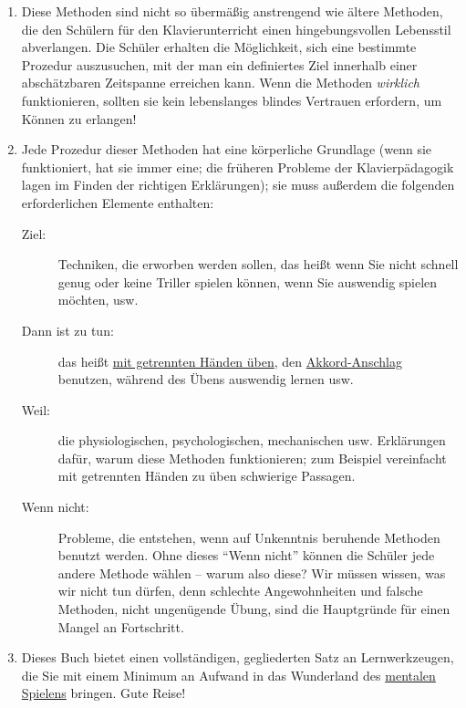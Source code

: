 \begin{enumerate}[label={\arabic*.}] 
\item Diese Methoden sind nicht so übermäßig anstrengend wie ältere Methoden, die den Schülern für den Klavierunterricht einen hingebungsvollen Lebensstil abverlangen.
Die Schüler erhalten die Möglichkeit, sich eine bestimmte Prozedur auszusuchen, mit der man ein definiertes Ziel innerhalb einer abschätzbaren Zeitspanne erreichen kann.
Wenn die Methoden \textit{wirklich} funktionieren, sollten sie kein lebenslanges blindes Vertrauen erfordern, um Können zu erlangen!

\item Jede Prozedur dieser Methoden hat eine körperliche Grundlage (wenn sie funktioniert, hat sie immer eine; die früheren Probleme der Klavierpädagogik lagen im Finden der richtigen Erklärungen); sie muss außerdem die folgenden erforderlichen Elemente enthalten:

\begin{description}
\item[Ziel:] Techniken, die erworben werden sollen, das heißt wenn Sie nicht schnell genug oder keine Triller spielen können, wenn Sie auswendig spielen möchten, usw.
\item[Dann ist zu tun:] das heißt \hyperref[c1ii7]{mit getrennten Händen üben}, den \hyperref[c1ii9]{Akkord-Anschlag} benutzen, während des Übens auswendig lernen usw.
\item[Weil:] die physiologischen, psychologischen, mechanischen usw. Erklärungen dafür, warum diese Methoden funktionieren; zum Beispiel vereinfacht mit getrennten Händen zu üben schwierige Passagen.
\item[Wenn nicht:] Probleme, die entstehen, wenn auf Unkenntnis beruhende Methoden benutzt werden.
Ohne dieses \enquote{Wenn nicht} können die Schüler jede andere Methode wählen -- warum also diese?
Wir müssen wissen, was wir nicht tun dürfen, denn schlechte Angewohnheiten und falsche Methoden, nicht ungenügende Übung, sind die Hauptgründe für einen Mangel an Fortschritt.
\end{description}

\item Dieses Buch bietet einen vollständigen, gegliederten Satz an Lernwerkzeugen, die Sie mit einem Minimum an Aufwand in das Wunderland des \hyperref[c1ii12mental]{mentalen Spielens} bringen.
Gute Reise!
\end{enumerate}


